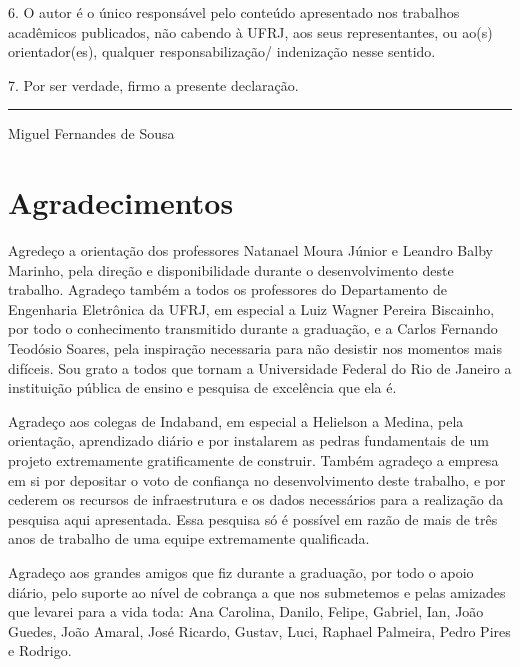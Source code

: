 \documentclass[tcc,numbers]{coppe}
\begin{document}
6. O autor é o único responsável pelo conteúdo apresentado nos trabalhos
acadêmicos publicados, não cabendo à UFRJ, aos seus representantes, ou ao(s)
orientador(es), qualquer responsabilização/ indenização nesse sentido.

7. Por ser verdade, firmo a presente declaração.

\vspace{4\baselineskip}

\noindent\hfill \rule{4in}{0.7pt}

\noindent\hfill Miguel Fernandes de Sousa
\newpage


  \dedication{Aos meus avós, Dona Filinha e Wilton.}

  \chapter*{Agradecimentos}

  Agredeço a orientação dos professores Natanael Moura Júnior e Leandro Balby
  Marinho, pela direção e disponibilidade durante o desenvolvimento deste
  trabalho. Agradeço também a todos os professores do Departamento de Engenharia
  Eletrônica da UFRJ, em especial a Luiz Wagner Pereira Biscainho, por todo o
  conhecimento transmitido durante a graduação, e a Carlos Fernando Teodósio
  Soares, pela inspiração necessaria para não desistir nos momentos mais
  difíceis. Sou grato a todos que tornam a Universidade Federal do Rio de
  Janeiro a instituição pública de ensino e pesquisa de excelência que ela é.

  Agradeço aos colegas de Indaband, em especial a Helielson a Medina, pela
  orientação, aprendizado diário e por instalarem as pedras fundamentais de um
  projeto extremamente gratificamente de construir. Também agradeço a empresa em
  si por depositar o voto de confiança no desenvolvimento deste trabalho, e
  por cederem os recursos de infraestrutura e os dados necessários para a
  realização da pesquisa aqui apresentada. Essa pesquisa só é possível em razão
  de mais de três anos de trabalho de uma equipe extremamente qualificada.

  Agradeço aos grandes amigos que fiz durante a graduação, por todo o apoio
  diário, pelo suporte ao nível de cobrança a que nos submetemos e pelas
  amizades que levarei para a vida toda: Ana Carolina, Danilo, Felipe, Gabriel,
  Ian, João Guedes, João Amaral, José Ricardo, Gustav, Luci, Raphael Palmeira,
  Pedro Pires e Rodrigo.
\end{document}

